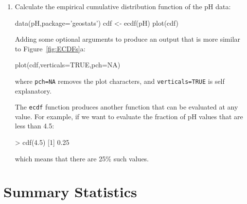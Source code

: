 \begin{enumerate}
\noindent where we have \textbf{nested} the \texttt{density} and
\texttt{plot} functions for the sake of brevity. Two-dimensional KDEs
are not part of base \texttt{R}. To access this functionality, we must
first load the important \texttt{MASS} (`Mathematical and Applied
Statistics with S\footnote{\texttt{S} is the name of the programming
  language. \texttt{R} is a free implementation of \texttt{S}, and
  \texttt{S-PLUS} is a commercial alternative.}') package.

\begin{script}[firstnumber=3]
library(MASS)
kde2 <- kde2d(x,y)
contour(kde2)
points(x,y)
\end{script}

\item Calculate the empirical cumulative distribution function of the
  pH data:

\begin{script}
data(pH,package='geostats')
cdf <- ecdf(pH)
plot(cdf)
\end{script}

Adding some optional arguments to produce an output that is more
similar to Figure~\ref{fig:ECDFs}a:

\begin{script}[firstnumber=3]
plot(cdf,verticals=TRUE,pch=NA)
\end{script}

\noindent where \texttt{pch=NA} removes the plot characters, and
\texttt{verticals=TRUE} is self explanatory.

The \texttt{ecdf} function produces another function that can be
evaluated at any value. For example, if we want to evaluate the
fraction of pH values that are less than 4.5:

\begin{console}
> cdf(4.5)
[1] 0.25
\end{console}

\noindent which means that there are 25\% such values.

\end{enumerate}

\section{Summary Statistics}
\label{sec:R-summary-statistics}


